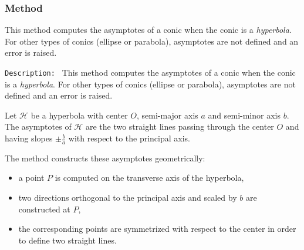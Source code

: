 \begin{minipage}{.3\textwidth}
\end{minipage}
\begin{minipage}{.7\textwidth}
\begin{tkzexample}
\end{tkzexample}
\end{minipage}



\subsubsection{Method }
\label{ssub:conic_asymptotes}

This method computes the asymptotes of a conic when the conic is a
\emph{hyperbola}.
For other types of conics (ellipse or parabola), asymptotes are not defined
and an error is raised.

\medskip

\texttt{Description: }
This method computes the asymptotes of a conic when the conic is a
\emph{hyperbola}.
For other types of conics (ellipse or parabola), asymptotes are not defined
and an error is raised.

\medskip

Let $\mathcal{H}$ be a hyperbola with center $O$, semi-major axis $a$ and
semi-minor axis $b$.
The asymptotes of $\mathcal{H}$ are the two straight lines passing through the
center $O$ and having slopes $\pm \tfrac{b}{a}$ with respect to the principal
axis.

The method constructs these asymptotes geometrically:
\begin{itemize}
  \item a point $P$ is computed on the transverse axis of the hyperbola,
  \item two directions orthogonal to the principal axis and scaled by $b$
        are constructed at $P$,
  \item the corresponding points are symmetrized with respect to the center
        in order to define two straight lines.
\end{itemize}


